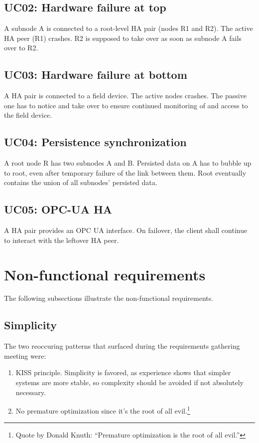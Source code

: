 \subsection{UC02: Hardware failure at top}
A subnode A is connected to a root-level HA pair (nodes R1 and R2). The active
HA peer (R1) crashes. R2 is supposed to take over as soon as subnode A fails
over to R2.

\subsection{UC03: Hardware failure at bottom}
A HA pair is connected to a field device. The active nodes crashes. The passive
one has to notice and take over to ensure continued monitoring of and access to
the field device.

\subsection{UC04: Persistence synchronization}
A root node R has two subnodes A and B. Persisted data on A has to bubble up to
root, even after temporary failure of the link between them. Root eventually
contains the union of all subnodes' persisted data.

\subsection{UC05: OPC-UA HA}
A HA pair provides an OPC UA interface. On failover, the client
shall continue to interact with the leftover HA peer.

\section{Non-functional requirements}
The following subsections illustrate the non-functional requirements.

\subsection{Simplicity}
The two reoccuring patterns that surfaced during the requirements gathering
meeting were:

\begin{enumerate}
\item \gls{KISS} principle. Simplicity is favored, as experience shows that
	simpler systems are more stable, so complexity should be avoided if not
	absolutely necessary.

\item No premature optimization since it's the root of all evil.\footnote{Quote
	by Donald Knuth: ``Premature optimization is the root of all evil.''}
\end{enumerate}


